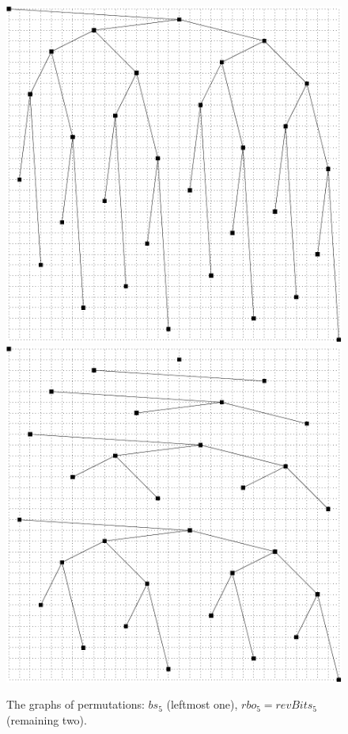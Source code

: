 \documentclass{llncs}
\begin{document}
\begin{figure}
{{    \includegraphics{revBits5tree.pdf} \hspace{2cm}
    \includegraphics{revBits5-1trees.pdf} \hspace{2cm}
  }
}
\caption{The graphs of permutations: $bs_5$ (leftmost one),  $rbo_5=revBits_5$ (remaining two).\label{fig-trees}}
\end{figure}
\end{document}

